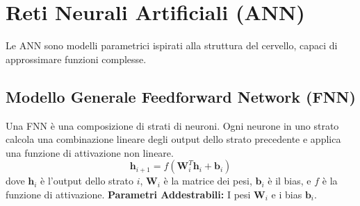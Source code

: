 \documentclass[a4paper,11pt]{article}
\begin{document}
\section{Reti Neurali Artificiali (ANN)}

Le ANN sono modelli parametrici ispirati alla struttura del cervello, capaci di approssimare funzioni complesse.

\subsection{Modello Generale Feedforward Network (FNN)}
Una FNN è una composizione di strati di neuroni. Ogni neurone in uno strato calcola una combinazione lineare degli output dello strato precedente e applica una funzione di attivazione non lineare.
\begin{equation}
    \mathbf{h}_{i+1} = f(\mathbf{W}_i^T \mathbf{h}_i + \mathbf{b}_i)
\end{equation}
dove $\mathbf{h}_i$ è l'output dello strato $i$, $\mathbf{W}_i$ è la matrice dei pesi, $\mathbf{b}_i$ è il bias, e $f$ è la funzione di attivazione.
\textbf{Parametri Addestrabili:} I pesi $\mathbf{W}_i$ e i bias $\mathbf{b}_i$.
\end{document}
